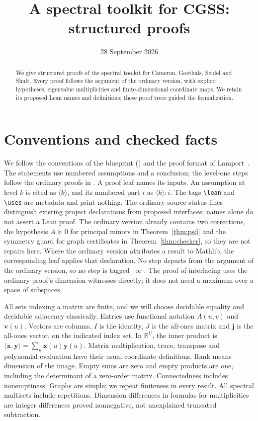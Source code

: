 \documentclass[11pt]{amsart}
\newcommand\re{{\mathbb R}}%
\newcommand\Zv{{\mathbf v}}
\newcommand\Zy{{\mathbf y}}
\newcommand\Zx{{\mathbf x}}
\newcommand\Zj{{\mathbf j}}
\newcommand\ip[2]{\langle#1,#2\rangle}
\theoremstyle{definition}
\begin{document}
\title{A spectral toolkit for CGSS: structured proofs}
\date{28 September 2026}
\begin{abstract}
We give structured proofs of the spectral toolkit for Cameron, Goethals,
Seidel and Shult. Every proof follows the argument of the ordinary version,
with explicit hypotheses, eigenvalue multiplicities and finite-dimensional
coordinate maps. We retain its proposed Lean names and definitions; these
proof trees guided the formalization.
\end{abstract}
\maketitle
\tableofcontents
\section{Conventions and checked facts}
We follow the conventions of the blueprint ()
and the proof format of Lamport~\cite{L95}. The statements use numbered assumptions and a conclusion; the
level-one steps follow the ordinary proofs in .
A proof leaf names its inputs. An assumption at level $k$ is cited as
$\langle k\rangle$, and its numbered part $i$ as $\langle k\rangle{:}i$.
The tags \verb|\lean| and \verb|\uses| are metadata and print nothing.
The ordinary source-status lines distinguish existing project declarations
from proposed interfaces; names alone do not assert a Lean proof. The
ordinary version already contains two corrections, the hypothesis $A\succeq0$ for
principal minors in Theorem~\ref{thm:psd} and the symmetry guard for
graph certificates in Theorem~\ref{thm:checker}, so they are not repairs here. Where the ordinary
version attributes a result to Mathlib, the corresponding leaf applies
that declaration. No step departs from the argument of the ordinary
version, so no step is tagged \new\ or \repair. The proof of interlacing
uses the ordinary proof's dimension witnesses directly; it does not need a
maximum over a space of subspaces.

All sets indexing a matrix are finite, and we will choose decidable
equality and decidable adjacency classically. Entries use functional
notation $A(u,v)$ and $\Zv(u)$. Vectors are columns, $I$ is the identity,
$J$ is the all-ones matrix and $\Zj$ is the all-ones vector, on the
indicated index set. In $\re^U$, the inner product is
$\ip{\Zx}{\Zy}=\sum_u\Zx(u)\Zy(u)$. Matrix multiplication, trace,
transpose and polynomial evaluation have their usual coordinate definitions.
Rank means dimension of the image. Empty sums are zero and empty products
are one, including the determinant of a zero-order matrix. Connectedness
includes nonemptiness. Graphs are simple; we repeat finiteness in every
result. All spectral multisets include repetitions. Dimension differences
in formulas for multiplicities are integer differences proved nonnegative,
not unexplained truncated subtraction.
\end{document}
